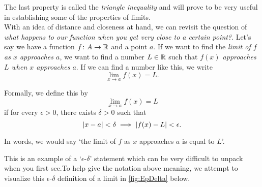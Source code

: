 The last property is called the \emph{triangle inequality} and will prove to be very useful in establishing some of the properties of limits.\\




With an idea of distance and closeness at hand, we can revisit the question of \emph{what happens to our function when you get very close to a certain point?}. Let's say we have a function $f\colon A\to \mathbb{R}$ and a point $a$. If we want to find the \emph{limit of $f$ as $x$ approaches $a$}, we want to find a number $L\in\mathbb{R}$ such that \emph{$f(x)$ approaches $L$ when $x$ approaches $a$}. If we can find a number like this, we write
\begin{equation}
	\lim_{x\to a}f(x)=L.
\end{equation}
\begin{defn}\label{EpsDeltaDef}
	Formally, we define this by
	\begin{equation}
		\lim_{x\to a}f(x)=L
	\end{equation}
if for every $\epsilon>0$, there exists $\delta>0$ such that
\begin{equation*}
\left| x-a \right|<\delta \implies \left| f(x)-L \right|< \epsilon.
\end{equation*}
\end{defn}
\begin{rem}
  In words, we would say `the limit of $f$ as $x$ approaches $a$ is equal to $L$'.
\end{rem}

This is an example of a `$\epsilon$-$\delta$' statement which can be very difficult to unpack when you first see.To help give the notation above meaning, we attempt to visualize this $\epsilon$-$\delta$ definition of a limit in \cref{fig:EpDelta} below.

